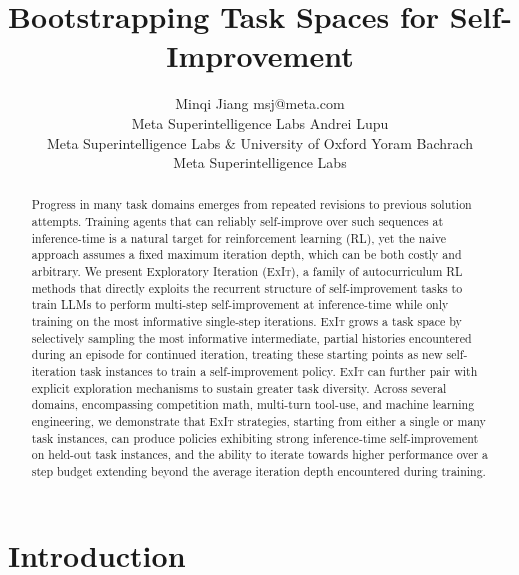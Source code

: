 \documentclass[10pt]{article} %
\title{Bootstrapping Task Spaces for Self-Improvement}
\author{\name Minqi Jiang \email msj@meta.com \\
      \addr Meta Superintelligence Labs
      \AND
      \name Andrei Lupu \\
      \addr Meta Superintelligence Labs \& University of Oxford
      \AND
      \name Yoram Bachrach \\
      \addr Meta Superintelligence Labs
}
\newcommand{\methodname}{\textsc{ExIt}}
\begin{document}
\maketitle

\begin{abstract}
Progress in many task domains emerges from repeated revisions to previous solution attempts. Training agents that can reliably self-improve over such sequences at inference-time is a natural target for reinforcement learning (RL), yet the naive approach assumes a fixed maximum iteration depth, which can be both costly and arbitrary. 
We present Exploratory Iteration (\methodname{}), a family of autocurriculum RL methods that directly exploits the recurrent structure of self-improvement tasks to train LLMs to perform multi-step self-improvement at inference-time while only training on the most informative single-step iterations. \methodname{} grows a task space by selectively sampling the most informative intermediate, partial histories encountered during an episode for continued iteration, treating these starting points as new self-iteration task instances to train a self-improvement policy. \methodname{} can further pair with explicit exploration mechanisms to sustain greater task diversity.
Across several domains, encompassing competition math, multi-turn tool-use, and machine learning engineering, we demonstrate that \methodname{} strategies, starting from either a single or many task instances, can produce policies exhibiting strong inference-time self-improvement on held-out task instances, and the ability to iterate towards higher performance over a step budget extending beyond the average iteration depth encountered during training.
\end{abstract}

\section{Introduction}
\end{document}
